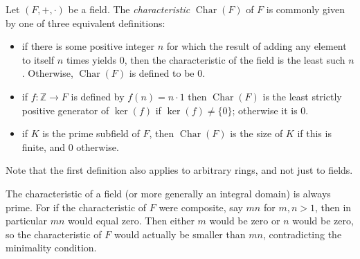 \documentclass[12pt]{article}
\DeclareMathOperator{\cha}{Char}
\begin{document}
Let $(F,+,\cdot)$ be a field.  The \emph{characteristic} $\cha(F)$ of $F$ is commonly given by one of three equivalent definitions:

\begin{itemize}
\item
if there is some positive integer $n$ for which the result of adding any element to itself $n$ times yields $0$, then the characteristic of the field is the least such $n$.  Otherwise, $\cha(F)$ is defined to be $0$.
\item
if $f:\mathbb{Z}\to F$ is defined by $f(n) = n\cdot 1$ then $\cha(F)$ is the least strictly positive generator of $\operatorname{ker}(f)$ if $\operatorname{ker}(f)\neq \{ 0\}$; otherwise it is $0$.
\item
if $K$ is the prime subfield of $F$, then $\cha(F)$ is the size of $K$ if this is finite, and $0$ otherwise.
\end{itemize}

Note that the first definition also applies to arbitrary rings, and not just to fields.

The characteristic of a field (or more generally an integral domain) is always prime.  For if the characteristic of $F$ were composite, say $mn$ for $m,n>1$, then in particular $mn$ would equal zero.  Then either $m$ would be zero or $n$ would be zero, so the characteristic of $F$ would actually be smaller than $mn$, contradicting the minimality condition.
\end{document}
